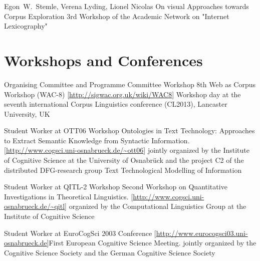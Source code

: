 \documentclass[11pt,a4paper]{moderncv}
\begin{document}
        {Egon~W.~Stemle, Verena Lyding, Lionel Nicolas}
        {\small On visual Approaches towards Corpus Exploration}
        {\small 3rd Workshop of the Academic Network on "Internet Lexicography"}
        {\small}
        {}

\closesection{}


\section{Workshops and Conferences}
        {Organising Committee and Programme Committee}
        {Workshop}
        {8th Web as Corpus Workshop (WAC-8)}
        {[\url{http://sigwac.org.uk/wiki/WAC8}]}
        {Workshop day at the seventh international Corpus Linguistics
        conference (CL2013), Lancaster University, UK}

        {Student Worker at OTT06}
        {Workshop}
        {Ontologies in Text Technology: Approaches to Extract Semantic
        Knowledge from Syntactic Information.}
        {[\url{http://www.cogsci.uni-osnabrueck.de/~ott06}]}
        {jointly organized by the Institute of Cognitive Science at the
        University of Osnabr\"{u}ck and the project C2 of the distributed
        DFG-research group Text Technological Modelling of Information}

        {Student Worker at QITL-2}
        {Workshop}
        {Second Workshop on Quantitative Investigations in Theoretical
        Linguistics.}
        {[\url{http://www.cogsci.uni-osnabrueck.de/~qitl}]}
        {organized by the Computational Linguistics Group at the Institute of
        Cognitive Science}

        {Student Worker at EuroCogSci 2003}
        {Conference}
        {[\url{http://www.eurocogsci03.uni-osnabrueck.de}]}{First European
        Cognitive Science Meeting.}
        {jointly organized by the Cognitive Science Society and the German
        Cognitive Science Society}
\closesection{}


\end{document}
